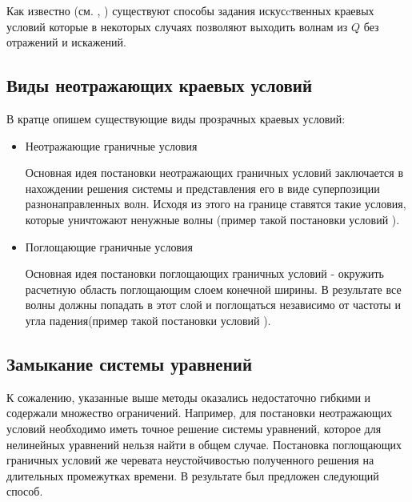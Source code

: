 Как известно (см. \cite{ilgamov}, \cite{ryabenky}) существуют способы задания искусcтвенных краевых условий которые в некоторых случаях позволяют выходить волнам из $Q$ без отражений и искажений.

\addtocounter{subsection}{1}
\subsection*{Виды неотражающих краевых условий}
В кратце опишем существующие виды прозрачных краевых условий:
\begin{itemize}
    \item Неотражающие граничные условия

	Основная идея постановки неотражающих граничных условий заключается в нахождении решения системы и представления его в виде суперпозиции разнонаправленных волн. Исходя из этого на границе ставятся такие условия, которые уничтожают ненужные волны (пример такой постановки условий \cite{mcdonald}).

    \item Поглощающие граничные условия

	Основная идея постановки поглощающих граничных условий -  окружить расчетную область поглощающим слоем конечной ширины. В результате все волны должны попадать в этот слой и поглощаться независимо от частоты и угла падения(пример такой постановки условий \cite{pml}).
\end{itemize}

\addtocounter{subsection}{1}
\subsection*{Замыкание системы уравнений}

К сожалению, указанные выше методы оказались недостаточно гибкими и содержали множество ограничений. Например, для постановки неотражающих условий необходимо иметь точное решение системы уравнений, которое для нелинейных уравнений нельзя найти в общем случае. Постановка поглощающих граничных условий же черевата неустойчивостью полученного решения на длительных промежутках времени. В результате был предложен следующий способ.

